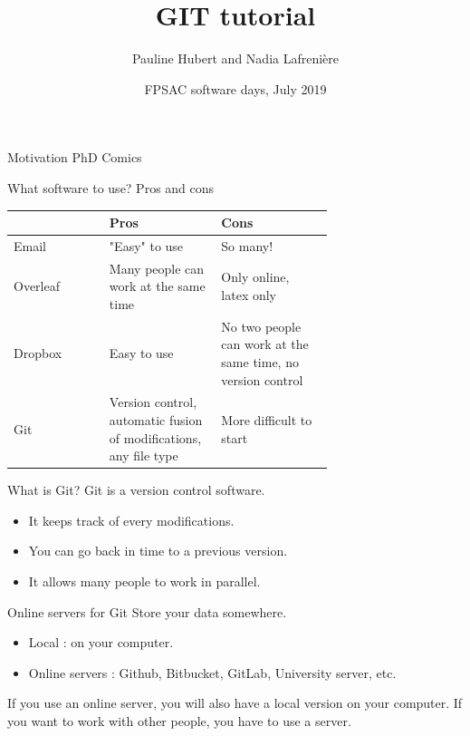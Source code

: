 \documentclass{beamer}
\title{GIT tutorial}
\author{Pauline Hubert and Nadia Lafrenière}
\date{FPSAC software days, July 2019}
\begin{document}
	\maketitle
	\begin{frame}{Motivation}
		PhD Comics
	\end{frame}

	\begin{frame}{What software to use? Pros and cons}
		\begin{tabular}{lp{0.35\linewidth}p{0.35\linewidth}}
			& Pros & Cons\\
			\hline
			Email & "Easy" to use & So many!\\
			\hline
			Overleaf & Many people can work at the same time & Only online, latex only\\
			\hline
			Dropbox & Easy to use & No two people can work at the same time, no version control\\
			\hline
			Git & Version control, automatic fusion of modifications, any file type & More difficult to start\\
		\end{tabular}
	\end{frame}

	\begin{frame}{What is Git?}
		Git is a version control software. \newline
		
		\begin{itemize}
			\item It keeps track of every modifications.
			\item You can go back in time to a previous version.
			\item It allows many people to work in parallel.
		\end{itemize}	
	\end{frame}

	\begin{frame}{Online servers for Git}
		Store your data somewhere. \newline 
			\begin{itemize}
				\item Local : on your computer.
				\item Online servers : Github, Bitbucket, GitLab, University server, etc. \newline
			\end{itemize}
		If you use an online server, you will also have a local version on your computer. If you want to work with other people, you have to use a server. 
	\end{frame}
\end{document}
